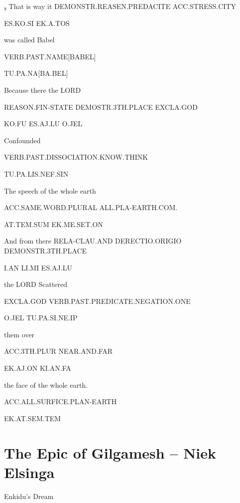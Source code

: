 { 

₉ That is way 				it 			DEMONSTR.REASEN.PREDACITE	ACC.STRESS.CITY	 

ES.KO.SI				EK.A.TOS		 

 

was called Babel 

VERB.PAST.NAME[BABEL] 

TU.PA.NA[BA.BEL] 

  

Because 		there 				the LORD  

REASON.FIN-STATE          DEMOSTR.3TH.PLACE		EXCLA.GOD 

KO.FU			ES.AJ.LU			O.JEL 

  

Confounded 

VERB.PAST.DISSOCIATION.KNOW.THINK	 

TU.PA.LIS.NEF.SIN                                               			 

 

The speech			 of the whole earth 

ACC.SAME.WORD.PLURAL 	ALL.PLA-EARTH.COM. 

AT.TEM.SUM			EK.ME.SET.ON 

 

And 			from 			there 		RELA-CLAU.AND	DERECTIO.ORIGIO      DEMONSTR.3TH.PLACE 

I.AN			LI.MI			ES.AJ.LU			 

the LORD	Scattered 

EXCLA.GOD	VERB.PAST.PREDICATE.NEGATION.ONE 

O.JEL		TU.PA.SI.NE.IP    

 

 them 		over 		 

ACC.3TH.PLUR	NEAR.AND.FAR	 

EK.AJ.ON	KI.AN.FA               

  

the face of the whole earth. 

ACC.ALL.SURFICE.PLAN-EARTH 

EK.AT.SEM.TEM 



\section{The Epic of Gilgamesh -- {\small Niek Elsinga}}


Enkidu’s Dream 

 
 

}
